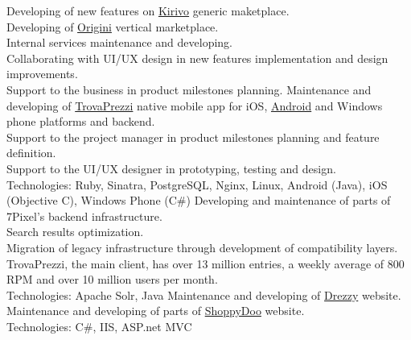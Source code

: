 \documentclass[letterpaper]{twentysecondcv} %
\begin{document}
\begin{twenty} %
	{Developing of new features on \href{http://www.kirivo.it}{Kirivo} generic maketplace.\\
	Developing of \href{http://www.origini.it}{Origini} vertical marketplace.\\
Internal services maintenance and developing.\\
Collaborating with UI/UX design in new features implementation and design improvements.\\
Support to the business in product milestones planning.}
	{Maintenance and developing of \href{http://www.trovaprezzi.it}{TrovaPrezzi} native mobile app for iOS, \href{https://play.google.com/store/apps/details?id=it.trovaprezzi.android}{Android}
and Windows phone platforms and backend.\\
Support to the project manager in product milestones planning and feature definition.\\
Support to the UI/UX designer in prototyping, testing and design.\\
Technologies: Ruby, Sinatra, PostgreSQL, Nginx, Linux, Android (Java), iOS (Objective C), Windows
Phone (C\#)}
{Developing and maintenance of parts of 7Pixel's backend infrastructure.\\
Search results optimization.\\
Migration of legacy infrastructure through development of compatibility layers.\\
TrovaPrezzi, the main client, has over 13 million entries, a weekly average of 800 RPM and over 10 million users per month.\\
Technologies: Apache Solr, Java}
{Maintenance and developing of \href{http://www.drezzy.id}{Drezzy} website.\\
Maintenance and developing of parts of \href{http://www.shoppydoo.it}{ShoppyDoo} website.\\
Technologies: C\#, IIS, ASP.net MVC}
\end{twenty}
\end{document}
